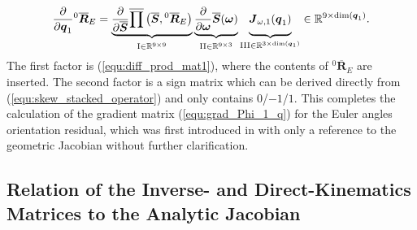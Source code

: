 \documentclass[robotics,article,accept,moreauthors,pdftex]{Definitions/mdpi}
\newcommand{\bm}[1]{\boldsymbol{#1}}
\newcommand{\rotmato}[2]{{{ }^{#1}\boldsymbol{\overline{R}}}_{#2}}
\begin{document}
\begin{equation}
\frac{\partial}{\partial \bm{q}_1}
\rotmato{0}{E}
=
\underbrace{
	\vphantom{\frac{\partial}{\partial \overline{\bm{S}}}}
	\frac{\partial}{\partial \overline{\bm{S}}}\overline{\prod}\left( \overline{\bm{S}}, \rotmato{0}{E}\right)
}_{\mathrm{I} \in {\mathbb{R}}^{9 \times 9}\vphantom{\mathrm{III} \in {\mathbb{R}}^{3 \times \mathrm{dim}(\bm{q}_1)}}}
\underbrace{
	\vphantom{\frac{\partial}{\partial \overline{\bm{S}}}}
	\frac{\partial}{\partial \bm{\omega}} \overline{\bm{S}}(\bm{\omega})
}_{\mathrm{II} \in {\mathbb{R}}^{9 \times 3}\vphantom{\mathrm{III} \in {\mathbb{R}}^{3 \times \mathrm{dim}(\bm{q}_1)}}}
\underbrace{
	\vphantom{\frac{\partial}{\partial \overline{\bm{S}}}}
	\bm{J}_{\omega,1}(\bm{q}_1)
}_{\mathrm{III} \in {\mathbb{R}}^{3 \times \mathrm{dim}(\bm{q}_1)}}
\in {\mathbb{R}}^{9 \times \mathrm{dim}(\bm{q}_1)}.
\label{equ:diff_rotmat_q}
\end{equation}
%
The first factor is (\ref{equ:diff_prod_mat1}), where the contents of $\rotmato{0}{E}$ are inserted.
The second factor is a sign matrix which can be derived directly from (\ref{equ:skew_stacked_operator}) and only contains $0$/$-1$/$1$.
This completes the calculation of the gradient matrix (\ref{equ:grad_Phi_1_q}) for the Euler angles orientation residual, which was first introduced in \cite{GoldenbergBenFen1985} with only a reference to the geometric Jacobian without further clarification.


\subsection{Relation of the Inverse- and Direct-Kinematics Matrices to the Analytic Jacobian}
\label{sec:appendix_gradient_geomjacobian}
\end{document}
